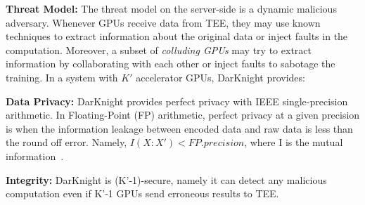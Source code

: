 \textbf{Threat Model:} %
The threat model on the server-side is a dynamic malicious adversary. %
Whenever GPUs receive data from TEE, they may use known techniques to extract information about the original data or inject faults in the computation. Moreover, a subset of \emph{colluding GPUs} may try to extract information by collaborating with each other or inject faults to sabotage the training. %
In a system with $K'$ accelerator GPUs, DarKnight provides: 

\textbf{Data Privacy:} DarKnight provides perfect privacy with IEEE single-precision arithmetic. In Floating-Point (FP) arithmetic, perfect privacy at a given precision is when the information leakage between encoded data and raw data is less than the round off error. Namely, $I(X:X') < FP.precision$, where I is the mutual information~\citep{cover1999elements, guo2020secure}. 

\textbf{Integrity:} DarKnight is (K'-1)-secure, namely it can detect any malicious computation even if K'-1 GPUs send erroneous results to TEE. 

